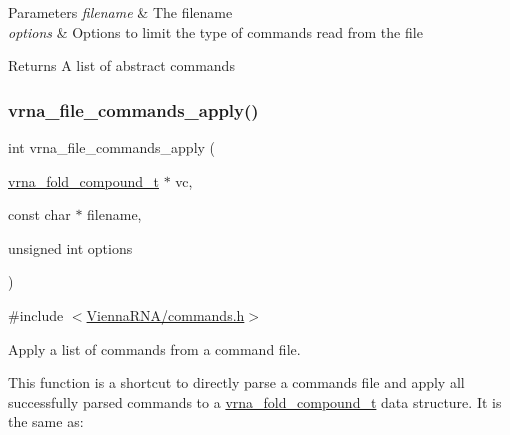 \begin{DoxyParams}{Parameters}
{\em filename} & The filename \\
\hline
{\em options} & Options to limit the type of commands read from the file \\
\hline
\end{DoxyParams}
\begin{DoxyReturn}{Returns}
A list of abstract commands 
\end{DoxyReturn}
\mbox{\label{group__command__files_gadbe8c9622f7bcc6dcbe3448b98df8656}} 
\subsubsection{\texorpdfstring{vrna\_file\_commands\_apply()}{vrna\_file\_commands\_apply()}}
{\footnotesize\ttfamily int vrna\+\_\+file\+\_\+commands\+\_\+apply (\begin{DoxyParamCaption}\item[{\mbox{\hyperlink{group__fold__compound_ga1b0cef17fd40466cef5968eaeeff6166}{vrna\+\_\+fold\+\_\+compound\+\_\+t}} $\ast$}]{vc,  }\item[{const char $\ast$}]{filename,  }\item[{unsigned int}]{options }\end{DoxyParamCaption})}



{\ttfamily \#include $<$\mbox{\hyperlink{commands_8h}{Vienna\+R\+N\+A/commands.\+h}}$>$}



Apply a list of commands from a command file. 

This function is a shortcut to directly parse a commands file and apply all successfully parsed commands to a \mbox{\hyperlink{group__fold__compound_ga1b0cef17fd40466cef5968eaeeff6166}{vrna\+\_\+fold\+\_\+compound\+\_\+t}} data structure. It is the same as\+: 
\begin{DoxyCodeInclude}{0}
\DoxyCodeLine{}
\DoxyCodeLine{}
\DoxyCodeLine{}
\end{DoxyCodeInclude}
 
